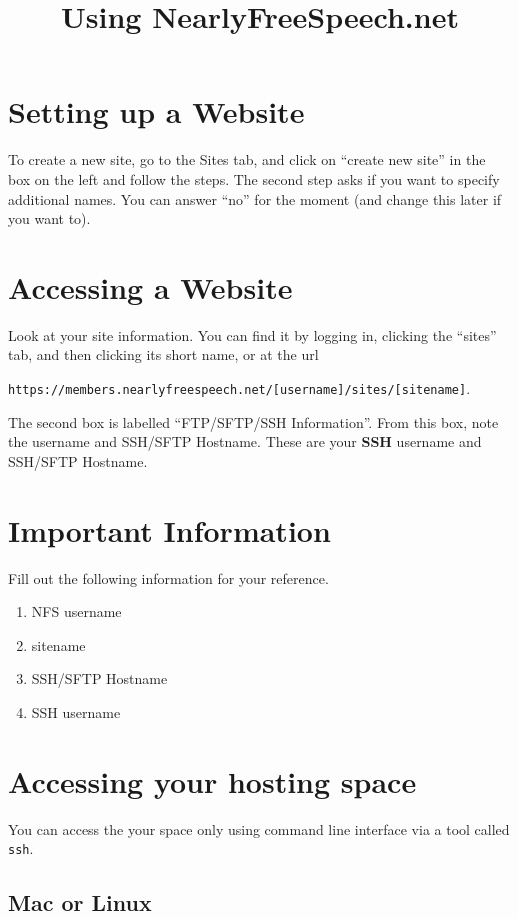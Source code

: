 \documentclass{article}
\title{Using NearlyFreeSpeech.net}
\date{}
\begin{document}
\maketitle
\section{Setting up a Website}
To create a new site, go to the Sites tab, and click on ``create new site'' in the box on the left and follow the steps.  The second step asks if you want to specify additional names.  You can answer ``no'' for the moment (and change this later if you want to).

\section{Accessing a Website}

Look at your site information.  You can find it by logging in, clicking the ``sites'' tab, and then clicking its short name, or at the url 
\begin{center}
\texttt{https://members.nearlyfreespeech.net/[username]/sites/[sitename]}.  
\end{center}

The second box is labelled ``FTP/SFTP/SSH Information''.  From this box, note the username and SSH/SFTP Hostname.  These are your {\bf SSH} username and SSH/SFTP Hostname.

\section{Important Information}
Fill out the following information for your reference.
\begin{enumerate}
\item NFS username
\item sitename
\item SSH/SFTP Hostname
\item SSH username

\end{enumerate}


\section{Accessing your hosting space}

You can access the your space only using command line interface via a tool called \texttt{ssh}.

\subsection{Mac or Linux}
\end{document}
